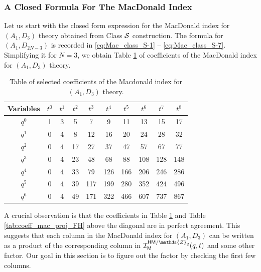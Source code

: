 \documentclass[a4paper,10pt]{article}
\newcommand{\mr}[1]{\mathsf{#1}}
\def\CI {{\cal I}}
\def\CI {{{\cal I}}}
\def\CS {{\cal S}}
\begin{document}
\subsubsection{A Closed Formula For The MacDonald Index}
Let us start with the closed form expression for the MacDonald index for $(A_1,D_3)$ theory obtained from Class $\CS$ construction. The formula for $(A_1,D_{2N-3})$ is recorded in \eqref{eq:Mac_class_S-1} -- \eqref{eq:Mac_class_S-7}. Simplifying it for $N=3$, we obtain Table \ref{tab:coeff_mac_A1D3} of coefficients of the MacDonald index for $(A_1,D_3)$ theory. 
\begin{table}[]
    \centering
    \begin{tabular}{|c|ccccccccc|} 
    \hline
Variables & $t^0$ & $t^1$ & $t^2$ & $t^3$ & $t^4$ & $t^5$ & $t^6$ & $t^7$ & $t^8$ \\\hline
$q^0$ & 1 & 3 & 5 & 7 & 9 & 11 & 13 & 15 & 17 \\
$q^1$ & 0 & 4 & 8 & 12 & 16 & 20 & 24 & 28 & 32 \\
$q^2$ & 0 & 4 & 17 & 27 & 37 & 47 & 57 & 67 & 77 \\
$q^3$ & 0 & 4 & 23 & 48 & 68 & 88 & 108 & 128 & 148 \\
$q^4$ & 0 & 4 & 33 & 79 & 126 & 166 & 206 & 246 & 286 \\
$q^5$ & 0 & 4 & 39 & 117 & 199 & 280 & 352 & 424 & 496 \\
$q^6$ & 0 & 4 & 49 & 171 & 322 & 466 & 607 & 737 & 867
\\
\hline
\end{tabular}
    \caption{Table of selected coefficients of the Macdonald index for $(A_1,D_3)$ theory.}
    \label{tab:coeff_mac_A1D3}
\end{table}

A crucial observation is that the coefficients in Table \ref{tab:coeff_mac_A1D3} and Table \ref{tab:coeff_mac_proj_FH} above the diagonal are in perfect agreement. This suggests that each column in the MacDonald index for $(A_1,D_3)$ can be written as a product of the corresponding column in $\CI_{\mr{M}}^{\mr{HM}/\mathds{Z}_2}(q,t)$ and some other factor. Our goal in this section is to figure out the factor by checking the first few columns. 
\end{document}
